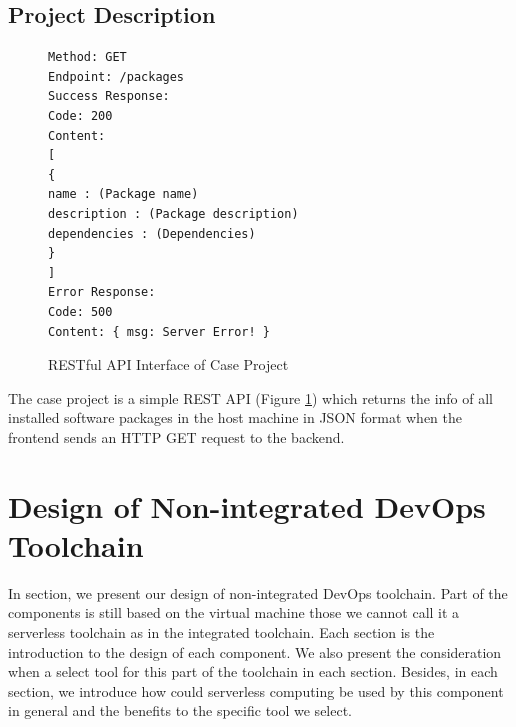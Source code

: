\subsection{Project Description}
\begin{figure}[!h]
\begin{verbatim}
Method: GET
Endpoint: /packages
Success Response:
Code: 200
Content:
[
{
name : (Package name)
description : (Package description)
dependencies : (Dependencies)
}
]
Error Response:
Code: 500
Content: { msg: Server Error! }
\end{verbatim}
\label{fig:rest}
\caption{RESTful API Interface of Case Project}
\end{figure}
The case project is a simple REST API (Figure \ref{fig:rest}) which returns the info of all installed software packages in the host machine in JSON format when the frontend sends an HTTP GET request to the backend.
\section{Design of Non-integrated DevOps Toolchain}
In section, we present our design of non-integrated DevOps toolchain. Part of the components is still based on the virtual machine those we cannot call it a serverless toolchain as in the integrated toolchain. Each section is the introduction to the design of each component. We also present the consideration when a select tool for this part of the toolchain in each section. Besides, in each section, we introduce how could serverless computing be used by this component in general and the benefits to the specific tool we select.
